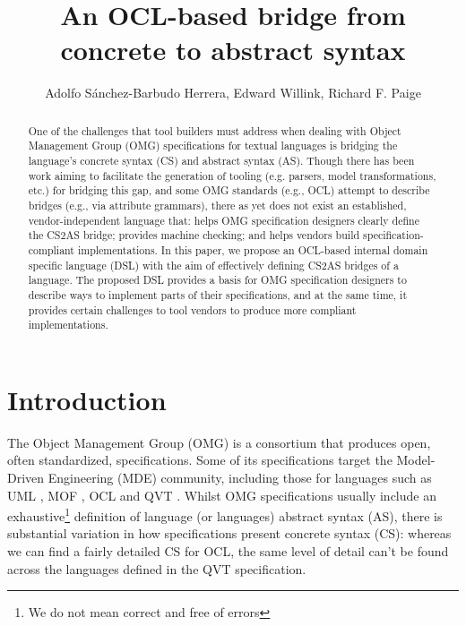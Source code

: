 \documentclass{llncs}
\begin{document}
\title{An OCL-based bridge from concrete to abstract syntax}

\author{Adolfo S\'{a}nchez-Barbudo Herrera, Edward Willink,
Richard F. Paige}

\maketitle

\begin{abstract}
One of the challenges that tool builders must address when dealing with Object Management Group (OMG) specifications for textual languages is bridging the language's concrete syntax (CS) and abstract syntax (AS). Though there has been work aiming to facilitate the generation of tooling (e.g. parsers, model transformations, etc.) for bridging this gap, and some OMG standards (e.g., OCL) attempt to describe bridges (e.g., via attribute grammars), there as yet does not exist an established, vendor-independent language that: helps OMG specification designers clearly define the CS2AS bridge; provides machine checking; and helps vendors build specification-compliant implementations. In this paper, we propose an OCL-based internal domain specific language (DSL) with the aim of effectively defining CS2AS bridges of a language. The proposed DSL provides a basis for OMG specification designers to describe ways to implement parts of their specifications, and at the same time, it provides certain challenges to tool vendors to produce more compliant implementations. %
\end{abstract}

\section{Introduction}

The Object Management Group (OMG) is a consortium  that produces open, often standardized, specifications. Some of its specifications target the Model-Driven Engineering (MDE) community, including those for languages such as UML \cite{omg2012uml}, MOF \cite{omg2013mof}, OCL \cite{omg2013ocl} and QVT \cite{omg2014qvt}. Whilst OMG specifications usually include an exhaustive\footnote{We do not mean correct and free of errors} definition of language (or languages) abstract syntax (AS), there is substantial variation in how specifications present concrete syntax (CS): whereas we can find a fairly detailed CS for OCL, the same level of detail can't be found across the languages defined in the QVT specification.
\end{document}
